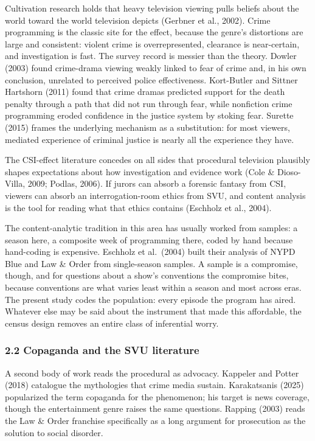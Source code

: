 \documentclass[
]{article}
\begin{document}
Cultivation research holds that heavy television viewing pulls beliefs
about the world toward the world television depicts (Gerbner et al.,
2002). Crime programming is the classic site for the effect, because the
genre's distortions are large and consistent: violent crime is
overrepresented, clearance is near-certain, and investigation is fast.
The survey record is messier than the theory. Dowler (2003) found
crime-drama viewing weakly linked to fear of crime and, in his own
conclusion, unrelated to perceived police effectiveness. Kort-Butler and
Sittner Hartshorn (2011) found that crime dramas predicted support for
the death penalty through a path that did not run through fear, while
nonfiction crime programming eroded confidence in the justice system by
stoking fear. Surette (2015) frames the underlying mechanism as a
substitution: for most viewers, mediated experience of criminal justice
is nearly all the experience they have.

The CSI-effect literature concedes on all sides that procedural
television plausibly shapes expectations about how investigation and
evidence work (Cole \& Dioso-Villa, 2009; Podlas, 2006). If jurors can
absorb a forensic fantasy from CSI, viewers can absorb an
interrogation-room ethics from SVU, and content analysis is the tool for
reading what that ethics contains (Eschholz et al., 2004).

The content-analytic tradition in this area has usually worked from
samples: a season here, a composite week of programming there, coded by
hand because hand-coding is expensive. Eschholz et al.~(2004) built
their analysis of NYPD Blue and Law \& Order from single-season samples.
A sample is a compromise, though, and for questions about a show's
conventions the compromise bites, because conventions are what varies
least within a season and most across eras. The present study codes the
population: every episode the program has aired. Whatever else may be
said about the instrument that made this affordable, the census design
removes an entire class of inferential worry.

\subsubsection{2.2 Copaganda and the SVU
literature}\label{copaganda-and-the-svu-literature}

A second body of work reads the procedural as advocacy. Kappeler and
Potter (2018) catalogue the mythologies that crime media sustain.
Karakatsanis (2025) popularized the term copaganda for the phenomenon;
his target is news coverage, though the entertainment genre raises the
same questions. Rapping (2003) reads the Law \& Order franchise
specifically as a long argument for prosecution as the solution to
social disorder.
\end{document}
